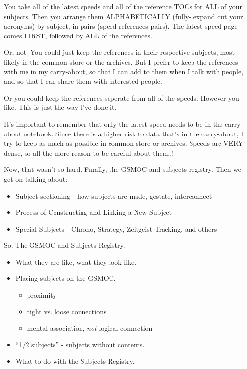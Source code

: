 \documentclass[oneside]{book}
\begin{document}
You take all of the latest speeds and all of the reference TOCs for
ALL of your subjects. Then you arrange them ALPHABETICALLY (fully-
expand out your acronyms) by subject, in pairs (speed-references
pairs). The latest speed page comes FIRST, followed by ALL of the
references.

Or, not. You could just keep the references in their respective
subjects, most likely in the common-store or the archives. But I
prefer to keep the references with me in my carry-about, so that I can
add to them when I talk with people, and so that I can share them with
interested people.

Or you could keep the references seperate from all of the
speeds. However you like. This is just the way I've done it.

It's important to remember that only the latest speed needs to be in
the carry-about notebook. Since there is a higher risk to data that's
in the carry-about, I try to keep as much as possible in common-store
or archives. Speeds are VERY dense, so all the more reason to be
careful about them..!

Now, that wasn't so hard. Finally, the GSMOC and subjects registry.
Then we get on talking about:

\begin{itemize}
\item Subject sectioning - how subjects are made, gestate, interconnect
\item Process of Constructing and Linking a New Subject
\item Special Subjects - Chrono, Strategy, Zeitgeist Tracking, and others
\end{itemize}

So. The GSMOC and Subjects Registry.

\begin{itemize}
\item What they are like, what they look like.
\item Placing subjects on the GSMOC.
\begin{itemize}
  \item proximity
  \item tight vs. loose connections
  \item mental association, \emph{not} logical connection
\end{itemize}
\item ``1/2 subjects'' - subjects without contents.
\item What to do with the Subjects Registry.
\end{itemize}
\end{document}
